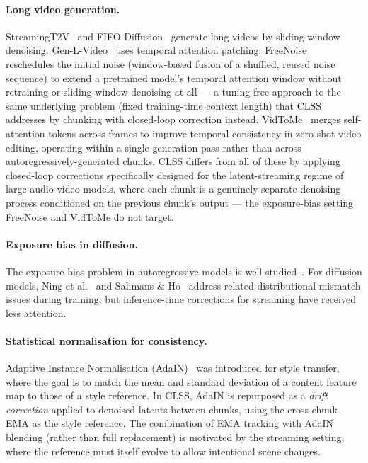 \documentclass[12pt]{article}
\begin{document}
\paragraph{Long video generation.}
StreamingT2V~\cite{henschel2024streamingt2v} and FIFO-Diffusion~\cite{kim2024fifo}
generate long videos by sliding-window denoising.  Gen-L-Video~\cite{wang2023gen}
uses temporal attention patching.  FreeNoise~\cite{qiu2024freenoise} reschedules
the initial noise (window-based fusion of a shuffled, reused noise sequence)
to extend a pretrained model's temporal attention window without retraining or
sliding-window denoising at all --- a tuning-free approach to the same
underlying problem (fixed training-time context length) that CLSS addresses by
chunking with closed-loop correction instead.  VidToMe~\cite{li2024vidtome}
merges self-attention tokens across frames to improve temporal consistency in
zero-shot video editing, operating within a single generation pass rather than
across autoregressively-generated chunks.  CLSS differs from all of these by
applying closed-loop corrections specifically designed for the latent-streaming
regime of large audio-video models, where each chunk is a genuinely separate
denoising process conditioned on the previous chunk's output --- the
exposure-bias setting FreeNoise and VidToMe do not target.

\paragraph{Exposure bias in diffusion.}
The exposure bias problem in autoregressive models is well-studied~\cite{bengio2015scheduled}.
For diffusion models, Ning et al.~\cite{ning2023elucidating} and
Salimans \& Ho~\cite{salimans2022progressive} address related distributional
mismatch issues during training, but inference-time corrections for streaming
have received less attention.

\paragraph{Statistical normalisation for consistency.}
Adaptive Instance Normalisation (AdaIN)~\cite{huang2017arbitrary} was introduced
for style transfer, where the goal is to match the mean and standard deviation of
a content feature map to those of a style reference.  In CLSS, AdaIN is
repurposed as a \emph{drift correction} applied to denoised latents between
chunks, using the cross-chunk EMA as the style reference.  The combination of
EMA tracking with AdaIN blending (rather than full replacement) is motivated by
the streaming setting, where the reference must itself evolve to allow
intentional scene changes.
\end{document}
